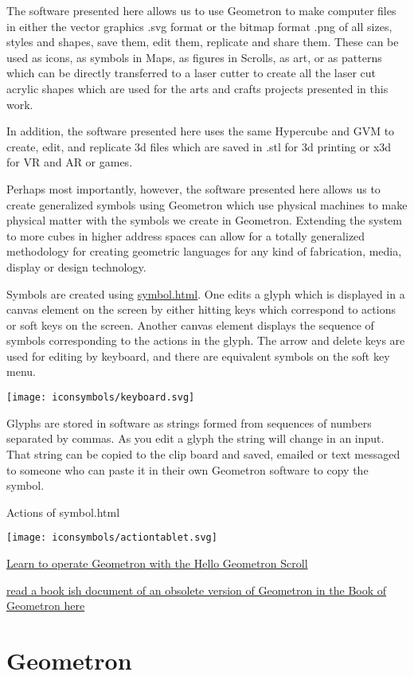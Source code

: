 The software presented here allows us to use Geometron to make computer
files in either the vector graphics .svg format or the bitmap format
.png of all sizes, styles and shapes, save them, edit them, replicate
and share them. These can be used as icons, as symbols in Maps, as
figures in Scrolls, as art, or as patterns which can be directly
transferred to a laser cutter to create all the laser cut acrylic shapes
which are used for the arts and crafts projects presented in this work.

In addition, the software presented here uses the same Hypercube and GVM
to create, edit, and replicate 3d files which are saved in .stl for 3d
printing or x3d for VR and AR or games.

Perhaps most importantly, however, the software presented here allows us
to create generalized symbols using Geometron which use physical
machines to make physical matter with the symbols we create in
Geometron. Extending the system to more cubes in higher address spaces
can allow for a totally generalized methodology for creating geometric
languages for any kind of fabrication, media, display or design
technology.

Symbols are created using \url{symbol.html}. One edits a glyph which is
displayed in a canvas element on the screen by either hitting keys which
correspond to actions or soft keys on the screen. Another canvas element
displays the sequence of symbols corresponding to the actions in the
glyph. The arrow and delete keys are used for editing by keyboard, and
there are equivalent symbols on the soft key menu.

\texttt{[image: iconsymbols/keyboard.svg]}

Glyphs are stored in software as strings formed from sequences of
numbers separated by commas. As you edit a glyph the string will change
in an input. That string can be copied to the clip board and saved,
emailed or text messaged to someone who can paste it in their own
Geometron software to copy the symbol.

Actions of symbol.html

\texttt{[image: iconsymbols/actiontablet.svg]}

\href{scrolls/hellogeometron}{Learn to operate Geometron with the Hello
Geometron Scroll}

\href{https://lafelabs.github.io/book_of_geometron.html}{read a book ish
document of an obsolete version of Geometron in the Book of Geometron
here}

\hypertarget{geometron}{%
\section{Geometron}\label{geometron}}

